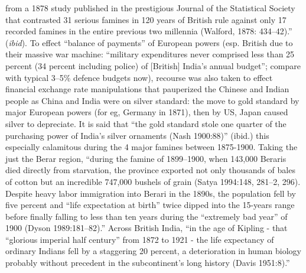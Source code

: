 from a 1878 study published in the prestigious Journal of the Statistical Society that contrasted 31 serious famines in 120 years of British rule against only 17 recorded famines in the entire previous two millennia (Walford, 1878: 434–42).” ({\sl ibid}). To effect “balance of payments” of European powers (esp. British due to their massive war machine: “military expenditures never comprised less than 25 percent (34 percent including police) of [British] India’s annual budget”; compare with typical 3--5\% defence budgets now), recourse was also taken to effect financial exchange rate manipulations that pauperized the Chinese and Indian people as China and India were on silver standard: the move to gold standard by major European powers (for eg, Germany in 1871), then by US, Japan caused silver to depreciate. It is said that “the gold standard stole one quarter of the purchasing power of India’s silver ornaments (Nash 1900:88)” (ibid.) this especially calamitous during the 4 major famines between 1875-1900. Taking the just the Berar region, “during the famine of 1899–1900, when 143,000 Beraris died directly from starvation, the province exported not only thousands of bales of cotton but an incredible 747,000 bushels of grain (Satya 1994:148, 281–2, 296). Despite heavy labor immigration into Berari in the 1890s, the population fell by five percent and “life expectation at birth” twice dipped into the 15-years range before finally falling to less than ten years during the “extremely bad year” of 1900 (Dyson 1989:181–82).” Across British India, “in the age of Kipling - that “glorious imperial half century” from 1872 to 1921 - the life expectancy of ordinary Indians fell by a staggering 20 percent, a deterioration in human biology probably without precedent in the subcontinent’s long history (Davis 1951:8).” 

